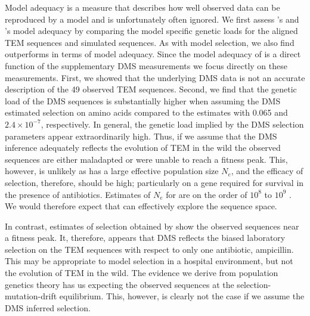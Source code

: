 \documentclass[fleqn,letterpaper]{article}
\begin{document}
Model adequacy is a measure that describes how well observed data can be reproduced by a model and is unfortunately often ignored.
We first assess \phydms's and \selac's model adequacy by comparing the model specific genetic loads for the aligned TEM sequences and simulated sequences.
As with model selection, we also find \selac outperforms \phydms in terms of model adequacy.
Since the model adequacy of \phydms is a direct function of the supplementary DMS measurements we focus directly on these measurements.
First, we showed that the underlying DMS data is not an accurate description of the 49 observed TEM sequences.
Second, we find that the genetic load of the DMS sequences is substantially higher when assuming the DMS estimated selection on amino acids compared to the \selac estimates with 0.065 and $2.4\times 10^{-7}$, respectively.
In general, the genetic load implied by the DMS selection parameters appear extraordinarily high.
Thus, if we assume that the DMS inference adequately reflects the evolution of TEM in the wild the observed sequences are either maladapted or were unable to reach a fitness peak.
This, however, is unlikely as \ecoli has a large effective population size $N_e$, and the efficacy of selection, therefore, should be high; particularly on a gene required for survival in the presence of antibiotics.
Estimates of $N_e$ for \ecoli are on the order of $10^8$ to $10^9$ \citep{OchmanAndWilson1987,hartl1994}.
We would therefore expect that \ecoli can effectively explore the sequence space.

In contrast, estimates of selection obtained by \selac show the observed sequences near a fitness peak.
It, therefore, appears that DMS reflects the biased laboratory selection on the TEM sequences with respect to only one antibiotic, ampicillin. 
This may be appropriate to model selection in a hospital environment, but not the evolution of TEM in the wild.
The evidence we derive from population genetics theory has us expecting the observed sequences at the selection-mutation-drift equilibrium.
This, however, is clearly not the case if we assume the DMS inferred selection.
\end{document}
